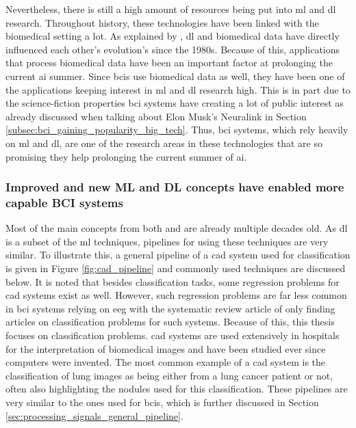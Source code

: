 Nevertheless, there is still a high amount of resources being put into \gls{ml} and \gls{dl} research.
Throughout history, these technologies have been linked with the biomedical setting a lot.
As explained by \citet{dl_and_biomedical}, \gls{dl} and biomedical data have directly influenced each other's evolution's since the 1980s.
Because of this, applications that process biomedical data have been an important factor at prolonging the current \gls{ai} summer.
Since \glspl{bci} use biomedical data as well, they have been one of the applications keeping interest in \gls{ml} and \gls{dl} research high.
This is in part due to the science-fiction properties \gls{bci} systems have creating a lot of public interest as already discussed when talking about Elon Musk's Neuralink in Section \ref{subsec:bci_gaining_popularity_big_tech}.
Thus, \gls{bci} systems, which rely heavily on \gls{ml} and \gls{dl}, are one of the research areas in these technologies that are so promising they help prolonging the current summer of \gls{ai}.


\subsubsection{Improved and new ML and DL concepts have enabled more capable BCI systems}
\label{subsubsec:bci_gaining_popularity_improved_data_processing_better_ml_dl}

Most of the main concepts from both  and  are already multiple decades old.
As \gls{dl} is a subset of the \gls{ml} techniques, pipelines for using these techniques are very similar.
To illustrate this, a general pipeline of a \gls{cad} system used for classification is given in Figure \ref{fig:cad_pipeline} and commonly used techniques are discussed below.
It is noted that besides classification tasks, some regression problems for \gls{cad} systems exist as well.
However, such regression problems are far less common in \gls{bci} systems relying on \gls{eeg} with the systematic review article of \citet{bci_review_arnau} only finding articles on classification problems for such systems.
Because of this, this thesis focuses on classification problems.
\gls{cad} systems are used extensively in hospitals for the interpretation of biomedical images and have been studied ever since computers were invented.
The most common example of a \gls{cad} system is the classification of lung images as being either from a lung cancer patient or not, often also highlighting the nodules used for this classification.
These pipelines are very similar to the ones used for \glspl{bci}, which is further discussed in Section \ref{sec:processing_signals_general_pipeline}.

